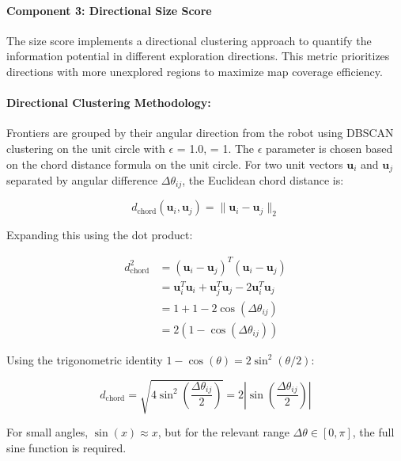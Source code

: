 \documentclass[11pt]{article}
\begin{document}
\paragraph{Component 3: Directional Size Score}

The size score implements a directional clustering approach to quantify the information potential in different exploration directions. This metric prioritizes directions with more unexplored regions to maximize map coverage efficiency.

\paragraph{Directional Clustering Methodology:}

Frontiers are grouped by their angular direction from the robot using DBSCAN clustering on the unit circle with 	$\epsilon$ = 1.0,  = 1. The $\epsilon$ parameter is chosen based on the chord distance formula on the unit circle. For two unit vectors $\mathbf{u}_i$ and $\mathbf{u}_j$ separated by angular difference $\Delta\theta_{ij}$, the Euclidean chord distance is:

\begin{equation}
	d_{\text{chord}}(\mathbf{u}_i, \mathbf{u}_j) = \|\mathbf{u}_i - \mathbf{u}_j\|_2
\end{equation}

Expanding this using the dot product:

\begin{align}
	d_{\text{chord}}^2 &= (\mathbf{u}_i - \mathbf{u}_j)^T(\mathbf{u}_i - \mathbf{u}_j) \\
	&= \mathbf{u}_i^T\mathbf{u}_i + \mathbf{u}_j^T\mathbf{u}_j - 2\mathbf{u}_i^T\mathbf{u}_j \\
	&= 1 + 1 - 2\cos(\Delta\theta_{ij}) \\
	&= 2(1 - \cos(\Delta\theta_{ij}))
\end{align}

Using the trigonometric identity $1 - \cos(\theta) = 2\sin^2(\theta/2)$:

\begin{equation}
	d_{\text{chord}} = \sqrt{4\sin^2\left(\frac{\Delta\theta_{ij}}{2}\right)} = 2\left|\sin\left(\frac{\Delta\theta_{ij}}{2}\right)\right|
\end{equation}

For small angles, $\sin(x) \approx x$, but for the relevant range $\Delta\theta \in [0, \pi]$, the full sine function is required.
\end{document}
